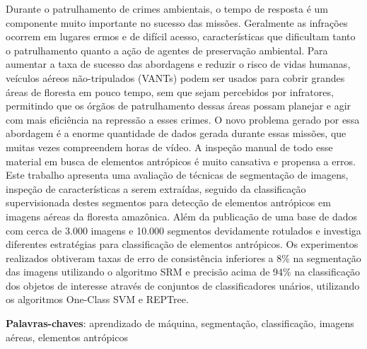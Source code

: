 \begin{resumo}
    Durante o patrulhamento de crimes ambientais, o tempo de resposta é um componente muito importante no sucesso das missões. Geralmente as infrações ocorrem em lugares ermos e de difícil acesso, características que dificultam tanto o patrulhamento quanto a ação de agentes de preservação ambiental. Para aumentar a taxa de sucesso das abordagens e reduzir o risco de vidas humanas, veículos aéreos não-tripulados (VANTs) podem ser usados para cobrir grandes áreas de floresta em pouco tempo, sem que sejam percebidos por infratores, permitindo que os órgãos de patrulhamento dessas áreas possam planejar e agir com mais eficiência na repressão a esses crimes. O novo problema gerado por essa abordagem é a enorme quantidade de dados gerada durante essas missões, que muitas vezes compreendem horas de vídeo. A inspeção manual de todo esse material em busca de elementos antrópicos é muito cansativa e propensa a erros. Este trabalho apresenta uma avaliação de técnicas de segmentação de imagens, inspeção de características a serem extraídas, seguido da classificação supervisionada destes segmentos para detecção de elementos antrópicos em imagens aéreas da floresta amazônica. Além da publicação de uma base de dados com cerca de 3.000 imagens e 10.000 segmentos devidamente rotulados e investiga diferentes estratégias para classificação de elementos antrópicos. Os experimentos realizados obtiveram taxas de erro de consistência inferiores a 8\% na segmentação das imagens utilizando o algoritmo SRM e precisão acima de 94\% na classificação dos objetos de interesse através de conjuntos de classificadores unários, utilizando os algoritmos One-Class SVM e REPTree.

    \vspace{\onelineskip}
    \noindent
    \textbf{Palavras-chaves}: aprendizado de máquina, segmentação, classificação, imagens aéreas, elementos antrópicos
\end{resumo}

